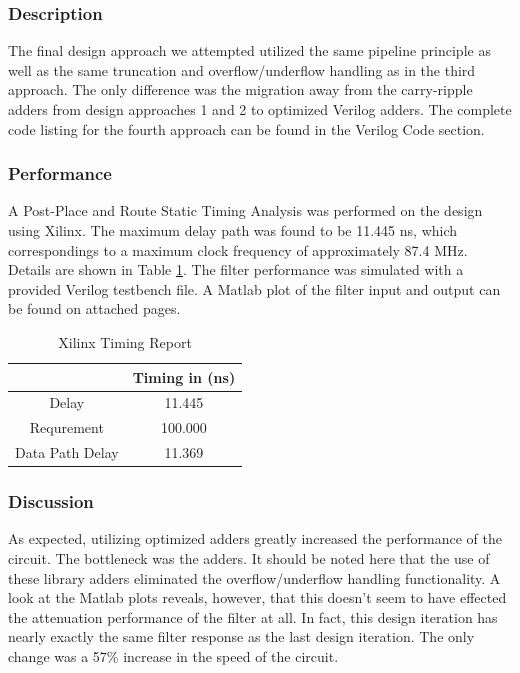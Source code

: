 \subsubsection*{Description}
The final design approach we attempted utilized the same pipeline principle as well as the same truncation and overflow/underflow handling as in the third approach. The only difference was the migration away from the carry-ripple adders from design approaches 1 and 2 to optimized Verilog adders. The complete code listing for the fourth approach can be found in the Verilog Code section.


\subsubsection*{Performance}
A Post-Place and Route Static Timing Analysis was performed on the design using Xilinx. The maximum delay path was found to be 11.445 ns, which correspondings to a maximum clock frequency of approximately 87.4 MHz. Details are shown in Table \ref{tab:timing4}. The filter performance was simulated with a provided Verilog testbench file. A Matlab plot of the filter input and output can be found on attached pages.

\begin{table}[h]
\caption{Xilinx Timing Report}
\begin{center}
\begin{tabular}{c|c}
           & Timing in (ns) \\
\hline
     Delay &   11.445  \\

Requrement &    100.000 \\

Data Path Delay & 11.369  \\
\end{tabular}  
\end{center}
\label{tab:timing4}
\end{table}

\subsubsection*{Discussion}
As expected, utilizing optimized adders greatly increased the performance of the circuit. The bottleneck was the adders. It should be noted here that the use of these library adders eliminated the overflow/underflow handling functionality. A look at the Matlab plots reveals, however, that this doesn't seem to have effected the attenuation performance of the filter at all. In fact, this design iteration has nearly exactly the same filter response as the last design iteration. The only change was a 57\% increase in the speed of the circuit.


